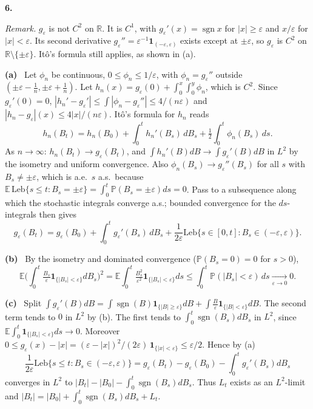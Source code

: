 \documentclass[11pt,a4paper]{article}
\newcommand{\E}{\mathbb{E}}
\renewcommand{\P}{\mathbb{P}}
\newcommand{\R}{\mathbb{R}}
\newcommand{\1}{\mathbf{1}}
\newcommand{\Leb}{\mathrm{Leb}}
\newcommand{\sgn}{\operatorname{sgn}}
\newcommand{\prob}[1]{\par\medskip\noindent\textbf{#1}\quad}
\newcommand{\sub}[1]{\par\smallskip\noindent\textbf{#1}\ }
\newcommand{\note}[1]{\par\noindent\emph{Remark.} #1}
\begin{document}
\prob{6.}
\note{$g_\varepsilon$ is not $C^2$ on $\R$. It is $C^1$, with
$g_\varepsilon'(x)=\sgn x$ for $|x|\ge\varepsilon$ and $x/\varepsilon$ for $|x|<\varepsilon$. Its second derivative
$g_\varepsilon''=\varepsilon^{-1}\1_{(-\varepsilon,\varepsilon)}$ exists except at $\pm\varepsilon$, so $g_\varepsilon$ is
$C^2$ on $\R\setminus\{\pm\varepsilon\}$. Itô's formula still applies, as shown in (a).}

\sub{(a)} Let $\phi_n$ be continuous, $0\le\phi_n\le1/\varepsilon$, with $\phi_n=g_\varepsilon''$ outside
$(\pm\varepsilon-\frac1n,\pm\varepsilon+\frac1n)$. Let $h_n(x)=g_\varepsilon(0)+\int_0^x\int_0^y\phi_n$, which is $C^2$. Since
$g_\varepsilon'(0)=0$, $|h_n'-g_\varepsilon'|\le\int|\phi_n-g_\varepsilon''|\le4/(n\varepsilon)$ and
$|h_n-g_\varepsilon|(x)\le4|x|/(n\varepsilon)$. Itô's formula for $h_n$ reads
\[
h_n(B_t)=h_n(B_0)+\int_0^th_n'(B_s)\,dB_s+\tfrac12\int_0^t\phi_n(B_s)\,ds .
\]
As $n\to\infty$: $h_n(B_t)\to g_\varepsilon(B_t)$, and $\int h_n'(B)dB\to\int g_\varepsilon'(B)dB$ in $L^2$ by the isometry and
uniform convergence. Also $\phi_n(B_s)\to g_\varepsilon''(B_s)$ for all $s$ with $B_s\ne\pm\varepsilon$, which is a.e.\ $s$ a.s.\
because $\E\,\Leb\{s\le t:B_s=\pm\varepsilon\}=\int_0^t\P(B_s=\pm\varepsilon)ds=0$. Pass to a subsequence along which the stochastic integrals converge a.s.; bounded
convergence for the $ds$-integrals then gives
\[
g_\varepsilon(B_t)=g_\varepsilon(B_0)+\int_0^tg_\varepsilon'(B_s)\,dB_s+\frac1{2\varepsilon}\Leb\{s\in[0,t]:B_s\in(-\varepsilon,\varepsilon)\}.
\]

\sub{(b)} By the isometry and dominated convergence ($\P(B_s=0)=0$ for $s>0$),
\[
\E\Big(\int_0^t\tfrac{B_s}{\varepsilon}\1_{\{|B_s|<\varepsilon\}}dB_s\Big)^2=\E\int_0^t\tfrac{B_s^2}{\varepsilon^2}\1_{\{|B_s|<\varepsilon\}}ds
\le\int_0^t\P(|B_s|<\varepsilon)\,ds\xrightarrow[\varepsilon\to0]{}0 .
\]

\sub{(c)} Split $\int g_\varepsilon'(B)dB=\int\sgn(B)\1_{\{|B|\ge\varepsilon\}}dB+\int\frac{B}{\varepsilon}\1_{\{|B|<\varepsilon\}}dB$.
The second term tends to $0$ in $L^2$ by (b). The first tends to $\int_0^t\sgn(B_s)dB_s$ in $L^2$, since
$\E\int_0^t\1_{\{|B_s|<\varepsilon\}}ds\to0$. Moreover $0\le g_\varepsilon(x)-|x|=(\varepsilon-|x|)^2/(2\varepsilon)\,\1_{\{|x|<\varepsilon\}}\le\varepsilon/2$.
Hence by (a)
\[
\frac1{2\varepsilon}\Leb\{s\le t:B_s\in(-\varepsilon,\varepsilon)\}=g_\varepsilon(B_t)-g_\varepsilon(B_0)-\int_0^tg_\varepsilon'(B_s)dB_s
\]
converges in $L^2$ to $|B_t|-|B_0|-\int_0^t\sgn(B_s)dB_s$. Thus $L_t$ exists as an $L^2$-limit and
$|B_t|=|B_0|+\int_0^t\sgn(B_s)dB_s+L_t$.
\end{document}
